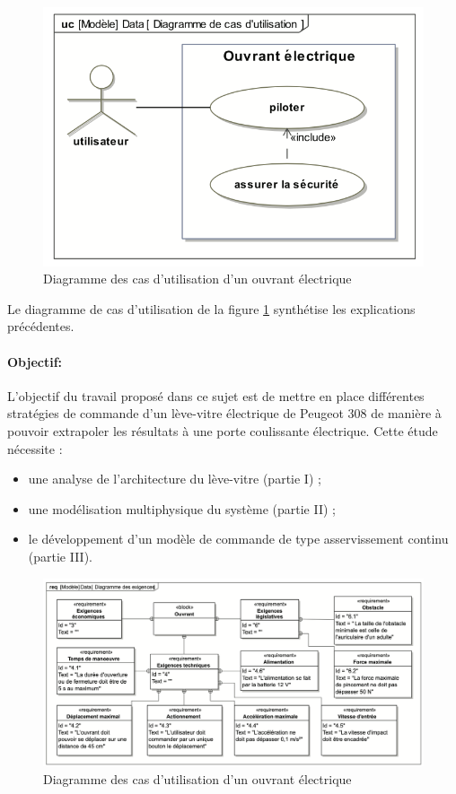 \begin{figure}[!h]
\centering\includegraphics[width=0.35\linewidth]{img/figure02}
 \caption{Diagramme des cas d'utilisation d'un ouvrant électrique}
 \label{img02}
\end{figure}

Le diagramme de cas d'utilisation de la figure \ref{img02} synthétise les explications précédentes. 

\paragraph{Objectif:}

L'objectif du travail proposé dans ce sujet est de mettre en place différentes stratégies de commande d'un lève-vitre électrique de Peugeot 308 de manière à pouvoir extrapoler les résultats à une porte coulissante électrique. Cette étude nécessite : 
\begin{itemize}
 \item une analyse de l'architecture du lève-vitre (partie I) ;
 \item une modélisation multiphysique du système (partie II) ;
 \item le développement d'un modèle de commande de type asservissement continu (partie III).
\end{itemize}

\begin{figure}[!h]
\centering\includegraphics[width=0.85\linewidth]{img/figure03}
 \caption{Diagramme des cas d'utilisation d'un ouvrant électrique}
 \label{img03}
\end{figure}
 
